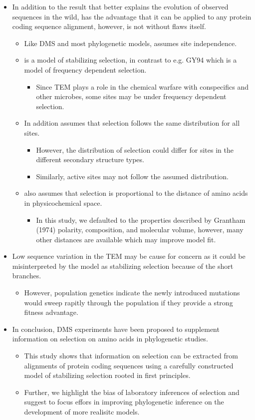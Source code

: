 \documentclass[12pt]{article}
\begin{document}
\begin{itemize}
	\item In addition to the result that \selac better explains the evolution of observed sequences in the wild, \selac has the advantage that it can be applied to any protein coding sequence alignment, however, is not without flaws itself.
	\begin{itemize}
		\item Like DMS and most phylogenetic models, \selac assumes site independence.
		\item \selac is a model of stabilizing selection, in contrast to e.g. GY94 which is a model of frequency dependent selection.
		\begin{itemize}
			\item Since TEM plays a role in the chemical warfare with conspecifics and other microbes, some sites may be under frequency dependent selection.
		\end{itemize}
		\item In addition \selac assumes that selection follows the same distribution for all sites.
		\begin{itemize}
			\item However, the distribution of selection could differ for sites in the different secondary structure types.
			\item Similarly, active sites may not follow the assumed distribution.
		\end{itemize}
		\item \selac also assumes that selection is proportional to the distance of amino acids in physicochemical space. 
		\begin{itemize}
			\item In this study, we defaulted to the properties described by Grantham (1974) polarity, composition, and molecular volume, however, many other distances are available which may improve model fit.
		\end{itemize}
	\end{itemize}
	\item Low sequence variation in the TEM may be cause for concern as it could be misinterpreted by the model as stabilizing selection because of the short branches.
	\begin{itemize}
		\item However, population genetics indicate the newly introduced mutations would sweep rapitly through the population if they provide a strong fitness advantage.
	\end{itemize}
	\item In conclusion, DMS experiments have been proposed to supplement information on selection on amino acids in phylogenetic studies.
	\begin{itemize}
		\item This study shows that information on selection can be extracted from alignments of protein coding sequences using a carefully constructed model of stabilizing selection rooted in first principles.
		\item Further, we highlight the bias of laboratory inferences of selection and suggest to focus effors in improving phylogenetic inference on the development of more realisitc models.
	\end{itemize}
\end{itemize}
\end{document}
